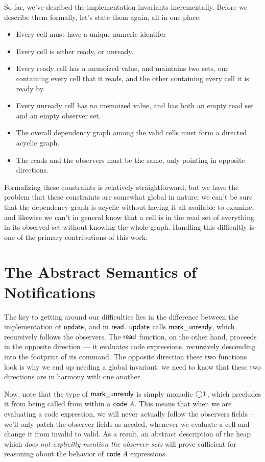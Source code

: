 \documentclass[preprint,natbib]{sigplanconf}
\begin{document}
So far, we've desribed the implementation invariants incrementally.
Before we describe them formally, let's state them again, all in 
one place: 

\begin{itemize}
  \item Every cell must have a unique numeric identifer
  \item Every cell is either ready, or unready. 
  \item Every ready cell has a memoized value, and maintains 
    two sets, one containing every cell that it reads, and the
    other containing every cell it is ready by. 
  \item Every unready cell has no memoized value, and has 
    both an empty read set and an empty observer set. 
  \item The overall dependency graph among the valid cells must form a
    directed acyclic graph. 
  \item The reads and the observers must be the same, only 
    pointing in opposite directions.
\end{itemize}

Formalizing these constraints is relatively straightforward, but we
have the problem that these constraints are somewhat global in nature:
we can't be sure that the dependency graph is acyclic without having
it all available to examine, and likewise we can't in general know
that a cell is in the read set of everything in its observed set
without knowing the whole graph. Handling this difficultly is one of
the primary contributions of this work. 

\section{The Abstract Semantics of Notifications}

The key to getting around our difficulties lies in the difference
between the implementation of $\mbox{\textsf{{update}}}$, and in $\mbox{\textsf{{read}}}$.
$\mbox{\textsf{{update}}}$ calls $\mbox{\textsf{{mark\_unready}}}$, which recursively follows
the observers. The $\mbox{\textsf{{read}}}$ function, on the other hand,
proceeds in the opposite direction --- it evaluates code expressions,
recursively descending into the footprint of its command. The opposite
direction these two functions look is why we end up needing a global
invariant: we need to know that these two directions are in harmony
with one another.

Now, note that the type of $\mbox{\textsf{{mark\_unready}}}$ is simply monadic
$\bigcirc{\mathbf{1}}$, which precludes it from being called from within
a $\mbox{\textsf{{code}}}\;{A}$. This means that when we are evaluating a code
expression, we will never actually follow the observers fields --
we'll only patch the observer fields as needed, whenever we evaluate a
cell and change it from invalid to valid.  As a result, an abstract
description of the heap which \emph{does not explicitly mention
the observer sets} will prove sufficient for reasoning about
the behavior of $\mbox{\textsf{{code}}}\;{A}$ expressions.
\end{document}
